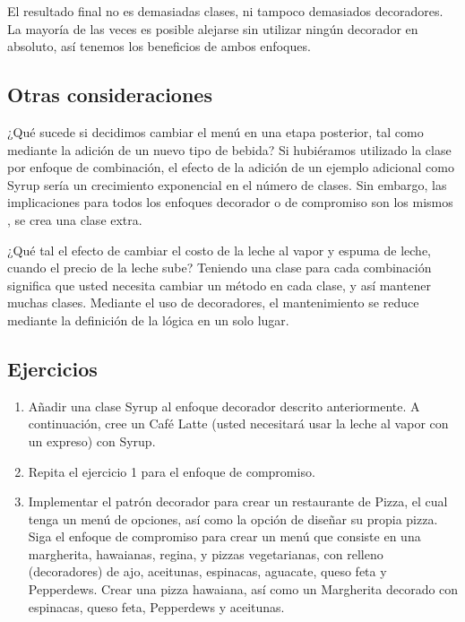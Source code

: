 El resultado final no es demasiadas clases, ni tampoco demasiados decoradores. La mayoría de las veces es posible alejarse sin utilizar ningún decorador en absoluto, así tenemos los beneficios de ambos enfoques.     \newline


\subsection*{Otras consideraciones}
\label{subsec:oc}


¿Qué sucede si decidimos cambiar el menú en una etapa posterior, tal como mediante la adición de un nuevo tipo de bebida? Si hubiéramos utilizado la clase por enfoque de combinación, el efecto de la adición de un ejemplo adicional como Syrup sería un crecimiento exponencial en el número de clases. Sin embargo, las implicaciones para todos los enfoques decorador o de compromiso son los mismos \- , se crea una clase extra.    \newline

¿Qué tal el efecto de cambiar el costo de la leche al vapor y espuma de leche, cuando el precio de la leche sube? Teniendo una clase para cada combinación significa que usted necesita cambiar un método en cada clase, y así mantener muchas clases. Mediante el uso de decoradores, el mantenimiento se reduce mediante la definición de la lógica en un solo lugar.  \newline

\subsection*{Ejercicios}
\label{subsec:ejer}

\begin{enumerate}[1.]
    \item Añadir una clase Syrup al enfoque decorador descrito anteriormente. A continuación, cree un Café Latte (usted necesitará usar la leche al vapor con un expreso) con Syrup.
    \item Repita el ejercicio 1 para el enfoque de compromiso.
    \item Implementar el patrón decorador para crear un restaurante de Pizza, el cual tenga un menú de opciones, así como la opción de diseñar su propia pizza. Siga el enfoque de compromiso para crear un menú que consiste en una margherita, hawaianas, regina, y pizzas vegetarianas, con relleno (decoradores) de ajo, aceitunas, espinacas, aguacate, queso feta y Pepperdews. Crear una pizza hawaiana, así como un Margherita decorado con espinacas, queso feta, Pepperdews y aceitunas.
\end{enumerate}

\newpage
